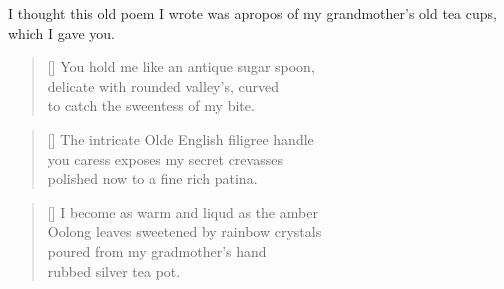 I thought this old poem I wrote was apropos of my grandmother's old tea cups, which I gave you.

\settowidth{\versewidth}{Oolong leaves sweetened by rainbow crystals}
\begin{verse}[\versewidth]
You hold me like an antique sugar spoon,\\
delicate with rounded valley's, curved\\
to catch the sweentess of my bite.
\end{verse}
\begin{verse}[\versewidth]
The intricate Olde English filigree handle\\
you caress exposes my secret crevasses\\
polished now to a fine rich patina.
\end{verse}
\begin{verse}[\versewidth]
I become as warm and liqud as the amber\\
Oolong leaves sweetened by rainbow crystals\\
poured from my gradmother's hand\\
rubbed silver tea pot.
\end{verse}
